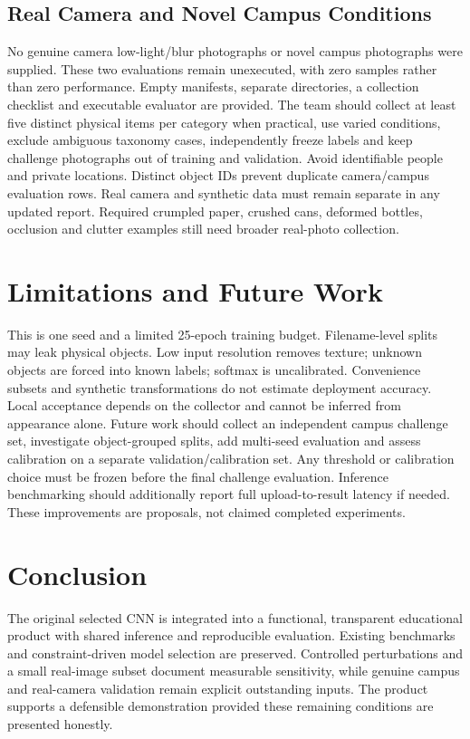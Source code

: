 \documentclass[conference]{IEEEtran}
\begin{document}
\subsection{Real Camera and Novel Campus Conditions}
No genuine camera low-light/blur photographs or novel campus photographs were supplied. These two evaluations remain unexecuted, with zero samples rather than zero performance. Empty manifests, separate directories, a collection checklist and executable evaluator are provided. The team should collect at least five distinct physical items per category when practical, use varied conditions, exclude ambiguous taxonomy cases, independently freeze labels and keep challenge photographs out of training and validation. Avoid identifiable people and private locations. Distinct object IDs prevent duplicate camera/campus evaluation rows. Real camera and synthetic data must remain separate in any updated report. Required crumpled paper, crushed cans, deformed bottles, occlusion and clutter examples still need broader real-photo collection.

\section{Limitations and Future Work}
This is one seed and a limited 25-epoch training budget. Filename-level splits may leak physical objects. Low input resolution removes texture; unknown objects are forced into known labels; softmax is uncalibrated. Convenience subsets and synthetic transformations do not estimate deployment accuracy. Local acceptance depends on the collector and cannot be inferred from appearance alone. Future work should collect an independent campus challenge set, investigate object-grouped splits, add multi-seed evaluation and assess calibration on a separate validation/calibration set. Any threshold or calibration choice must be frozen before the final challenge evaluation. Inference benchmarking should additionally report full upload-to-result latency if needed. These improvements are proposals, not claimed completed experiments.

\section{Conclusion}
The original selected CNN is integrated into a functional, transparent educational product with shared inference and reproducible evaluation. Existing benchmarks and constraint-driven model selection are preserved. Controlled perturbations and a small real-image subset document measurable sensitivity, while genuine campus and real-camera validation remain explicit outstanding inputs. The product supports a defensible demonstration provided these remaining conditions are presented honestly.
\newpage


\end{document}
